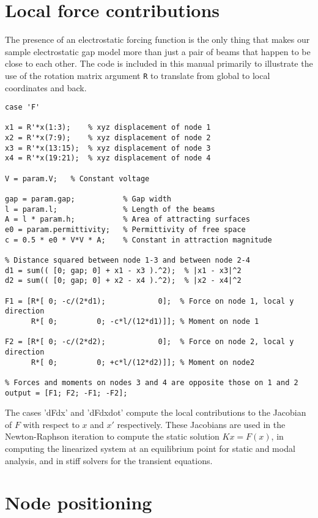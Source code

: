 \section{Local force contributions}

The presence of an electrostatic forcing function is the only thing that
makes our sample electrostatic gap model more than just a pair of beams 
that happen to be close to each other.  The code is included in this
manual primarily to illustrate the use of the rotation matrix argument
\texttt{R} to translate from global to local coordinates and back.

\begin{verbatim}
case 'F'

x1 = R'*x(1:3);    % xyz displacement of node 1
x2 = R'*x(7:9);    % xyz displacement of node 2
x3 = R'*x(13:15);  % xyz displacement of node 3
x4 = R'*x(19:21);  % xyz displacement of node 4

V = param.V;   % Constant voltage

gap = param.gap;           % Gap width
l = param.l;               % Length of the beams
A = l * param.h;           % Area of attracting surfaces
e0 = param.permittivity;   % Permittivity of free space 
c = 0.5 * e0 * V*V * A;    % Constant in attraction magnitude

% Distance squared between node 1-3 and between node 2-4
d1 = sum(( [0; gap; 0] + x1 - x3 ).^2);  % |x1 - x3|^2
d2 = sum(( [0; gap; 0] + x2 - x4 ).^2);  % |x2 - x4|^2

F1 = [R*[ 0; -c/(2*d1);            0];  % Force on node 1, local y direction
      R*[ 0;         0; -c*l/(12*d1)]]; % Moment on node 1

F2 = [R*[ 0; -c/(2*d2);            0];  % Force on node 2, local y direction
      R*[ 0;         0; +c*l/(12*d2)]]; % Moment on node2 

% Forces and moments on nodes 3 and 4 are opposite those on 1 and 2
output = [F1; F2; -F1; -F2];

\end{verbatim}

The cases 'dFdx' and 'dFdxdot' compute the local contributions to
the Jacobian of $F$ with respect to $x$ and $x'$ respectively.
These Jacobians are used in the Newton-Raphson iteration to compute
the static solution $Kx = F(x)$, in computing the linearized system
at an equilibrium point for static and modal analysis, and in
stiff solvers for the transient equations.

\section{Node positioning}

